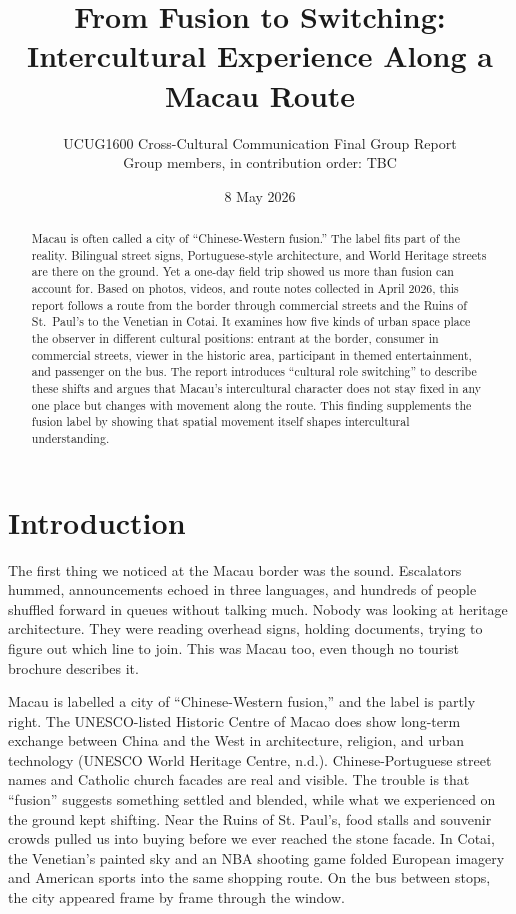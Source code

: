 \documentclass[12pt,a4paper]{article}
\title{From Fusion to Switching: Intercultural Experience Along a Macau Route}
\author{UCUG1600 Cross-Cultural Communication Final Group Report\\
Group members, in contribution order: TBC}
\date{8 May 2026}
\begin{document}
\renewcommand{\abstractname}{Abstract}
\renewcommand{\figurename}{Figure}
\renewcommand{\tablename}{Table}
\maketitle

\begin{abstract}
Macau is often called a city of ``Chinese-Western fusion.'' The label fits part of the reality. Bilingual street signs, Portuguese-style architecture, and World Heritage streets are there on the ground. Yet a one-day field trip showed us more than fusion can account for. Based on photos, videos, and route notes collected in April 2026, this report follows a route from the border through commercial streets and the Ruins of St.\ Paul's to the Venetian in Cotai. It examines how five kinds of urban space place the observer in different cultural positions: entrant at the border, consumer in commercial streets, viewer in the historic area, participant in themed entertainment, and passenger on the bus. The report introduces ``cultural role switching'' to describe these shifts and argues that Macau's intercultural character does not stay fixed in any one place but changes with movement along the route. This finding supplements the fusion label by showing that spatial movement itself shapes intercultural understanding.
\end{abstract}

\section{Introduction}

The first thing we noticed at the Macau border was the sound. Escalators hummed, announcements echoed in three languages, and hundreds of people shuffled forward in queues without talking much. Nobody was looking at heritage architecture. They were reading overhead signs, holding documents, trying to figure out which line to join. This was Macau too, even though no tourist brochure describes it.

Macau is labelled a city of ``Chinese-Western fusion,'' and the label is partly right. The UNESCO-listed Historic Centre of Macao does show long-term exchange between China and the West in architecture, religion, and urban technology (UNESCO World Heritage Centre, n.d.). Chinese-Portuguese street names and Catholic church facades are real and visible. The trouble is that ``fusion'' suggests something settled and blended, while what we experienced on the ground kept shifting. Near the Ruins of St. Paul's, food stalls and souvenir crowds pulled us into buying before we ever reached the stone facade. In Cotai, the Venetian's painted sky and an NBA shooting game folded European imagery and American sports into the same shopping route. On the bus between stops, the city appeared frame by frame through the window.
\end{document}
